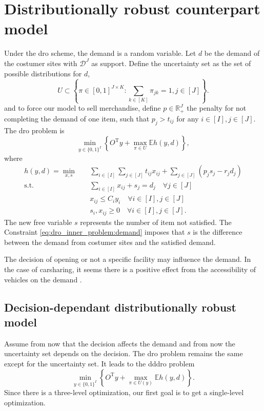 \documentclass[12pt, letterpaper]{article}
\newcommand{\R}{\mathbb{R}}
\newcommand{\T}{\mathrm{T}}
\newcommand{\E}{\mathbb{E}}
\newcommand{\Dcal}{\mathcal{D}}
\begin{document}
	\section{Distributionally robust counterpart model}
	Under the \gls{dro} scheme, the demand is a random variable. Let $d$ be the demand of the costumer sites with $\Dcal^J$ as support. Define the uncertainty set as the set of possible distributions for $d$,
	\begin{equation} \label{eq:def_uncertainty_set}
		U \subset \left\{\pi \in [0, 1]^{J \times K}: \sum_{k \in [K]} \pi_{jk} = 1, j \in [J]\right\}.
	\end{equation}
	and to force our model to sell merchandise, define $p \in \R_+^J$ the penalty for not completing the demand of one item, such that $p_j > t_{ij}$ for any $i \in [I], j \in [J]$. The \gls{dro} problem is
	\begin{equation}\label{eq:dro_outter_problem}
		\min_{y \in \{0, 1\}^I} \left\{O^\T y + \max_{\pi \in U} \E h(y, d)\right\},
	\end{equation}
	where
	\begin{subequations} \label{eq:dro_inner_problem}
		\begin{align}
			h(y, d) = \min_{x, s} &\quad \sum_{i \in [I]} \sum_{j \in [J]} t_{ij}x_{ij} + \sum_{j \in [J]} (p_j s_j - r_j d_j) \\
			\text{s.t.} &\quad \sum_{i \in [I]} x_{ij} + s_j = d_j \quad \forall j \in [J] \\ \label{eq:dro_inner_problem:demand}
			&\quad x_{ij} \le C_i y_i \quad \forall i \in [I], j \in [J] \\
			&\quad s_i, x_{ij} \ge 0 \quad \forall i \in [I], j \in [J].
		\end{align}
	\end{subequations}
	The new free variable $s$ represents the number of item not satisfied. The Constraint \eqref{eq:dro_inner_problem:demand} imposes that $s$ is the difference between the demand from costumer sites and the satisfied demand.
	
	
	The decision of opening or not a specific facility may influence the demand. In the case of carsharing, it seems there is a positive effect from the accessibility of vehicles on the demand \cite{ciari_modeling_2014}.
	
	\subsection{Decision-dependant distributionally robust model}
	Assume from now that the decision affects the demand and from now the uncertainty set depends on the decision. The \gls{dro} problem remains the same except for the uncertainty set. It leads to the \gls{dddro} problem 
	\begin{equation}\label{eq:dddro_outter_problem}
		\min_{y \in \{0, 1\}^I} \left\{O^\T y + \max_{\pi \in U(y)} \E h(y, d)\right\}.
	\end{equation}
	Since there is a three-level optimization, our first goal is to get a single-level optimization.
	
\end{document}
